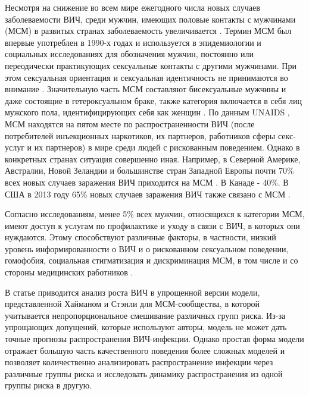 \documentclass[a4paper]{report}
\begin{document}
	Несмотря на снижение во всем мире ежегодного числа новых случаев заболеваемости ВИЧ, среди мужчин, имеющих половые контакты с мужчинами (МСМ) в развитых странах заболеваемость увеличивается \cite{link8, link9}. Термин МСМ был впервые употреблен в 1990-х годах и используется в эпидемиологии и социальных исследованиях для обозначения мужчин, постоянно или переодически практикующих сексуальные контакты с другими мужчинами. При этом сексуальная ориентация и сексуальная идентичность не принимаются во внимание \cite{link10}. Значительную часть МСМ составляют бисексуальные мужчины и даже состоящие в гетероксуальном браке, также категория включается в себя лиц мужского пола, идентифицирующих себя как женщин \cite{link11}.
	По данным UNAIDS \cite{link12}, МСМ находятся на пятом месте по распространенности ВИЧ (после потребителей инъекционных наркотиков, их партнеров, работников сферы секс-услуг и их партнеров) в мире среди людей с рискованным поведением. Однако в конкретных странах ситуация совершенно иная. Например, в Северной Америке, Австралии, Новой Зеландии и большинстве стран Западной Европы почти 70\% всех новых случаев заражения ВИЧ приходится на МСМ \cite{link13}. В Канаде - 40\%. В США в 2013 году 65\% новых случаев заражения ВИЧ также связано с МСМ \cite{link14}.
	
	Согласно исследованиям, менее 5\% всех мужчин, относящихся к категории МСМ, имеют доступ к услугам по профилактике и уходу в связи с ВИЧ, в которых они нуждаются. Этому способствуют различные факторы, в частности, низкий уровень информированности о ВИЧ и о рискованном сексуальном поведении, гомофобия, социальная стигматизация и дискриминация МСМ, в том числе и со стороны медицинских работников \cite{link15}.
	
	В статье \cite{link16} приводится анализ роста ВИЧ в упрощенной версии модели, представленной Хайманом и Стэнли \cite{link3} для МСМ-сообщества, в которой учитывается непропорциональное смешивание различных групп риска. Из-за упрощающих допущений, которые используют авторы, модель не может дать точные прогнозы распространения ВИЧ-инфекции. Однако простая форма модели отражает большую часть качественного поведения более сложных моделей и позволяет количественно анализировать распространение инфекции через различные группы риска и исследовать динамику распространения из одной группы риска в другую.
	
\end{document}
